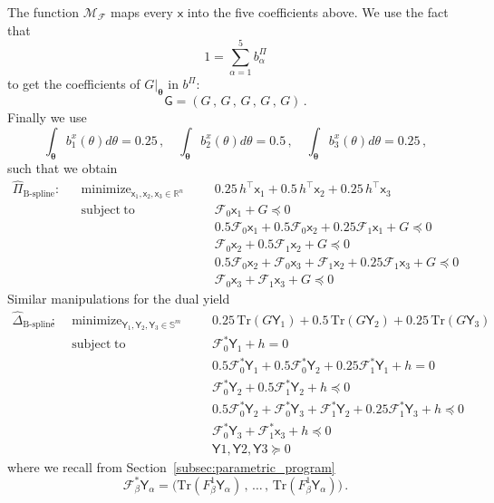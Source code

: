 \documentclass{article}
\DeclareMathOperator*{\minimize}{minimize}
\DeclareMathOperator*{\subj}{subject\;to}
\newcommand{\R}{\mathbb{R}}         %
\renewcommand{\S}{\mathbb{S}}       %
\newcommand{\Tr}{\mathrm{Tr}}       %
\renewcommand{\t}{\intercal}        %
\newcommand{\adj}{\ast}                     %
\newcommand{\ppar}{\theta}                          %
\newcommand{\Ppar}{{\bm{\theta}}}                   %
\newcommand{\calF}{\mathcal{F}}                     %
\newcommand{\bx}{b^x}               %
\newcommand{\cx}{\textsf{x}}        %
\newcommand{\bPi}{b^\Pi}                %
\newcommand{\bPia}{b^\Pi_\alpha}        %
\newcommand{\calMF}{\mathcal{M}_{\mathcal{F}}}
\newcommand{\cG}{\textsf{G}}            %
\newcommand{\cY}{\textsf{Y}}            %
\newcommand{\cYa}{\textsf{Y}_\alpha}            %
\begin{document}
The function $\calMF$ maps every $\cx$ into the five coefficients above. We use the fact that
\[ 1 = \sum_{\alpha=1}^5 \bPia
\]
to get the coefficients of $G|_\Ppar$ in $\bPi$:
\[ \cG = (G \,,\, G \,,\, G \,,\, G \,,\, G) \,.%
\]
Finally we use
\[ \int_\Ppar \bx_1(\ppar)d\ppar = 0.25\,,\quad \int_\Ppar \bx_2(\ppar)d\ppar = 0.5 \,,\quad \int_\Ppar \bx_3(\ppar)d\ppar = 0.25 \,,%
\]
such that we obtain
\[\begin{aligned}
\hat{\Pi}_{\text{B-spline}}: && \minimize_{\cx_1,\cx_2,\cx_3\in\R^n} &&&  0.25\,h^\t\cx_1 + 0.5\,h^\t\cx_2 + 0.25\,h^\t\cx_3  \\%
                             && \subj                               &&& \calF_0\cx_1 + G \preceq 0 \\%
                             &&                                     &&& 0.5\calF_0\cx_1 + 0.5\calF_0\cx_2 + 0.25 \calF_1\cx_1 + G \preceq 0 \\%
                             &&                                     &&& \calF_0\cx_2+0.5\calF_1\cx_2 + G \preceq 0 \\%
                             &&                                     &&& 0.5\calF_0\cx_2+\calF_0\cx_3+\calF_1\cx_2+0.25\calF_1\cx_3 + G \preceq 0 \\%
                             &&                                     &&& \calF_0\cx_3 +\calF_1\cx_3 + G \preceq 0 %
\end{aligned}\]
Similar manipulations for the dual yield
\[\begin{aligned}
\hat{\Delta}_{\text{B-spline}}: && \minimize_{\cY_1,\cY_2,\cY_3\in\S^m} &&&  0.25\,\Tr(G\cY_1) + 0.5\,\Tr(G\cY_2) + 0.25\,\Tr(G\cY_3)  \\%
                                && \subj                                &&& \calF^\adj_0\cY_1 + h = 0 \\%
                                &&                                      &&& 0.5\calF^\adj_0\cY_1 + 0.5\calF^\adj_0\cY_2 + 0.25 \calF^\adj_1\cY_1 + h = 0 \\%
                                &&                                      &&& \calF^\adj_0\cY_2+0.5\calF^\adj_1\cY_2 + h \preceq 0 \\%
                                &&                                      &&& 0.5\calF^\adj_0\cY_2+\calF^\adj_0\cY_3+\calF^\adj_1\cY_2+0.25\calF^\adj_1\cY_3 + h \preceq 0 \\%
                                &&                                      &&& \calF^\adj_0\cY_3 +\calF^\adj_1\cx_3 + h \preceq 0 \\%
                                &&                                      &&& \cY1, \cY2, \cY3 \succeq 0 %
\end{aligned}\]
where we recall from Section~\ref{subsec:parametric_program}
\[ \calF^\adj_\beta \cYa = \big(\Tr(F_\beta^1\cYa) \,,\, \ldots \,,\, \Tr(F_\beta^1\cYa) \big)\,.%
\]
\end{document}
